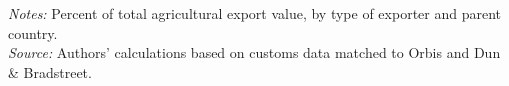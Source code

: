 \documentclass[11pt,a4paper]{article}
\begin{document}
\begin{table}[H]\centering\small%
  \caption{Agriculture: Share of Total Exports, by Parent Country}%
  \label{tab:f4tn_agro}%
  \par\vspace{3pt}%
  \begin{minipage}{0.95\textwidth}\footnotesize %
  \textit{Notes:} Percent of total agricultural export value, by type of exporter and parent country.\\[3pt]%
  \textit{Source:} Authors' calculations based on customs data matched to Orbis and Dun \& Bradstreet.%
  \end{minipage}%
  \end{table}
\end{document}
